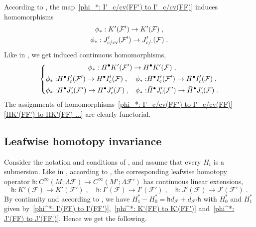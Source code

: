 \documentclass{memo-l}
\theoremstyle{plain}
\theoremstyle{definition}
\theoremstyle{remark}
\newcommand{\FF}{\mathcal{F}}
\newcommand{\sh}{\mathsf{h}}
\newcommand{\co}{{\text{\rm c}}}
\newcommand{\cv}{{\text{\rm cv}}}
\numberwithin{section}{chapter}
\numberwithin{equation}{section}%
\begin{document}
According to , the map~\eqref{phi_*: I'_c/cv(FF') to I'_c/cv(FF)} induces homomorphisms
\begin{gather}
\phi_*:K'(\FF')\to K'(\FF)\;,\label{phi_*:K'(FF') to K'(FF)}\\
\phi_*:J'_{\co/\cv}(\FF')\to J'_{\co/{\cdot}}(\FF)\;.\label{phi_*: J'_c/cv(FF') to J'_c/.(FF)}
\end{gather}
Like in , we get induced continuous homomorphisms,
\begin{equation}\label{HK'(FF') to HK'(FF) ...}
\left\{
\begin{gathered}
\phi_*:H^\bullet K'(\FF')\to H^\bullet K'(\FF)\;,\\
\begin{alignedat}{2}
\phi_*:&H^\bullet I'_\co(\FF')\to H^\bullet I'_\co(\FF)\;,&\quad
\phi_*:&\bar H^\bullet I'_\co(\FF')\to\bar H^\bullet I'_\co(\FF)\;,\\
\phi_*:&H^\bullet J'_\co(\FF')\to H^\bullet J'_\co(\FF)\;,&\quad
\phi_*:&\bar H^\bullet J'_\co(\FF')\to\bar H^\bullet J'_\co(\FF)\;.
\end{alignedat}
\end{gathered}
\right.
\end{equation} 
The assignments of homomorphisms~\eqref{phi_*: I'_c/cv(FF') to I'_c/cv(FF)}--\eqref{HK'(FF') to HK'(FF) ...} are clearly functorial. 


\subsection{Leafwise homotopy invariance}\label{ss: leafwise homotopy invariance - dual-conormal}

Consider the notation and conditions of , and assume that every $H_t$ is a submersion. Like in , according to , the corresponding leafwise homotopy operator $\sh:C^\infty(M;\Lambda\FF)\to C^\infty(M';\Lambda\FF')$ has continuous linear extensions,
\[
\sh:K'(\FF)\to K'(\FF')\;,\quad\sh:I'(\FF)\to I'(\FF')\;,\quad\sh:J'(\FF)\to J'(\FF')\;.
\]
By continuity and according to , we have $H_1^*-H_0^*=\sh d_\FF+d_{\FF'}\sh$ with $H_0^*$ and $H_1^*$ given by~\eqref{phi^*: I'(FF) to I'(FF')},~\eqref{phi^*: K'(FF) to K'(FF')} and~\eqref{phi^*: J'(FF) to J'(FF')}. Hence we get the following.
\end{document}
